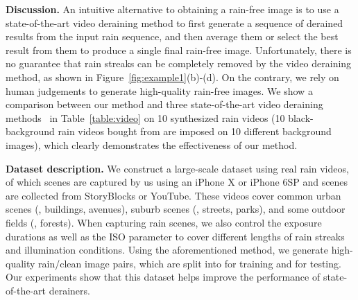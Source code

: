\documentclass[10pt,twocolumn,letterpaper]{article}
\begin{document}
{\bf Discussion.} An intuitive alternative to obtaining a rain-free image is to use a state-of-the-art video deraining method to first generate a sequence of derained results from the input rain sequence, and then average them or select the best result from them to produce a single final rain-free image. Unfortunately, there is no guarantee that rain streaks can be completely removed by the video deraining method, as shown in Figure~\ref{fig:example1}(b)-(d). 
On the contrary, we rely on human judgements to generate high-quality rain-free images.
We show a comparison between our method and three state-of-the-art video deraining methods~\cite{jiang:cvpr:2017:dip,wei:iccv:2017:ds,li:cvpr:2018:mcsc} in Table~\ref{table:video} on 10 synthesized rain videos (10 black-background rain videos bought from \cite{rainstreaks} are imposed on 10 different background images), which clearly demonstrates the effectiveness of our method.


\begin{table}[t]
\centering
{}
\caption{Comparison with the state-of-the-art video deraining methods. In each method, we select the frame of highest PSNR for comparison. The average PSNR/SSIM are in brackets.}
\label{table:video}
\vspace{-4mm}
\end{table}




{\bf Dataset description.} We construct a large-scale dataset using  real rain videos, of which  scenes are captured by us using an iPhone X or iPhone 6SP
and  scenes are collected from StoryBlocks or YouTube.
These videos cover common urban scenes (\eg, buildings, avenues), suburb scenes (\eg, streets, parks), and some outdoor fields (\eg, forests). When capturing rain scenes, we also control the exposure durations as well as the ISO parameter to cover different lengths of rain streaks and illumination conditions.
Using the aforementioned method, we generate  high-quality rain/clean image pairs, which are split into  for training and  for testing. Our experiments show that this dataset helps improve the performance of state-of-the-art derainers.
\end{document}
